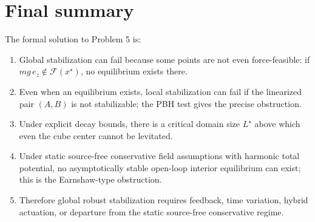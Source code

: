 \documentclass[11pt]{article}
\theoremstyle{definition}
\begin{document}
\section{Final summary}

The formal solution to Problem 5 is:
\begin{enumerate}[label=\textbf{(\arabic*)}, leftmargin=1.5em]
    \item Global stabilization can fail because some points are not even force-feasible: if $mg\,e_z\notin\mathcal{F}(x^\star)$, no equilibrium exists there.
    \item Even when an equilibrium exists, local stabilization can fail if the linearized pair $(A,B)$ is not stabilizable; the PBH test gives the precise obstruction.
    \item Under explicit decay bounds, there is a critical domain size $L^\star$ above which even the cube center cannot be levitated.
    \item Under static source-free conservative field assumptions with harmonic total potential, no asymptotically stable open-loop interior equilibrium can exist; this is the Earnshaw-type obstruction.
    \item Therefore global robust stabilization requires feedback, time variation, hybrid actuation, or departure from the static source-free conservative regime.
\end{enumerate}
\end{document}

